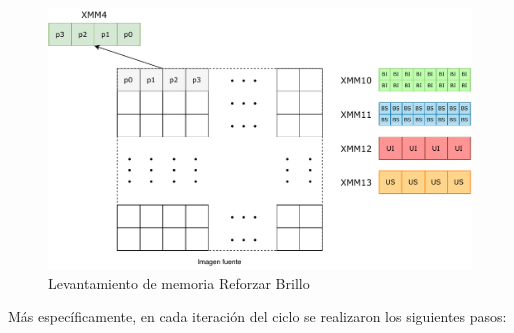 \documentclass[a4paper]{article}
\begin{document}
\begin{figure}[h]
	\centering
	\includegraphics[scale=0.6]{img/LevReforzarBrillov2.pdf}
	\caption{Levantamiento de memoria Reforzar Brillo}
\end{figure}

\newpage 
\justify 
 Más específicamente, en cada iteración del ciclo se realizaron los siguientes pasos:
 
\end{document}
